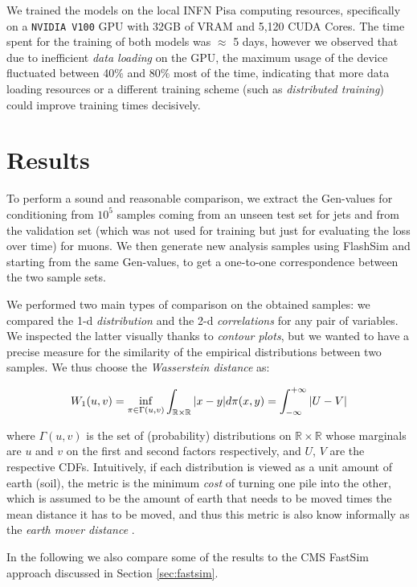 We trained the models on the local INFN Pisa computing resources, specifically on a \texttt{NVIDIA V100} GPU with 32GB of VRAM and 5,120 CUDA Cores. The time spent for the training of both models was $\approx$ 5 days, however we observed that due to inefficient \emph{data loading} on the GPU, the maximum usage of the device fluctuated between 40$\%$ and 80$\%$ most of the time, indicating that more data loading resources or a different training scheme (such as \emph{distributed training}) could improve training times decisively.

\section{Results}

To perform a sound and reasonable comparison, we extract the Gen-values for conditioning from $10^{5}$ samples coming from an unseen test set for jets and from the validation set (which was not used for training but just for evaluating the loss over time) for muons. We then generate new analysis samples using FlashSim and starting from the same Gen-values, to get a one-to-one correspondence between the two sample sets.

We performed two main types of comparison on the obtained samples: we compared the 1-d \emph{distribution} and the 2-d \emph{correlations} for any pair of variables.
We inspected the latter visually thanks to \emph{contour plots}, but we wanted to have a precise measure for the similarity of the empirical distributions between two samples. We thus choose the \emph{Wasserstein distance} as:

\[W_1(u, v) = \inf_{\pi \in \Gamma(u, v)}\int_{\mathbb{R}\times\mathbb{R}}\abs{x-y}d\pi(x,y) = \int_{-\infty}^{+\infty} \abs{U - V}\]

where $\Gamma(u, v)$ is the set of (probability) distributions on $\mathbb{R}\times\mathbb{R}$ whose marginals are $u$ and $v$ on the first and second factors respectively, and $U$, $V$ are the respective CDFs. Intuitively, if each distribution is viewed as a unit amount of earth (soil), the metric is the minimum \emph{cost} of turning one pile into the other, which is assumed to be the amount of earth that needs to be moved times the mean distance it has to be moved, and thus this metric is also know informally as the \emph{earth mover distance} \cite{https://doi.org/10.48550/arxiv.1509.02237}. 

In the following we also compare some of the results to the CMS FastSim approach discussed in Section \ref{sec:fastsim}.

